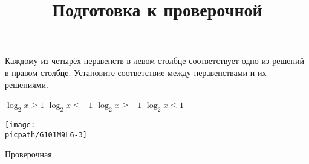 \begin{class}[number=7]
	\title{Подготовка к проверочной}
	\begin{listofex}
		\item Каждому из четырёх неравенств в левом столбце соответствует одно из решений в правом столбце. Установите соответствие между неравенствами и их решениями. \\
		\begin{minipage}[t]{\bodywidth}
			\begin{tasks}
				\task \( \log_2 x \ge 1 \)
				\task \( \log_2 x \le -1 \)
				\task \( \log_2 x \ge -1 \)
				\task \( \log_2 x \le 1 \)
			\end{tasks}
		\end{minipage}
		\hspace{0.02\linewidth}
		\begin{minipage}[t]{\picwidth}
			\texttt{[image: \\picpath/G101M9L6-3]}
		\end{minipage}
	\end{listofex}
\end{class}

\begin{exam}
	\begin{listofex}
		\item Проверочная
	\end{listofex}
\end{exam}

